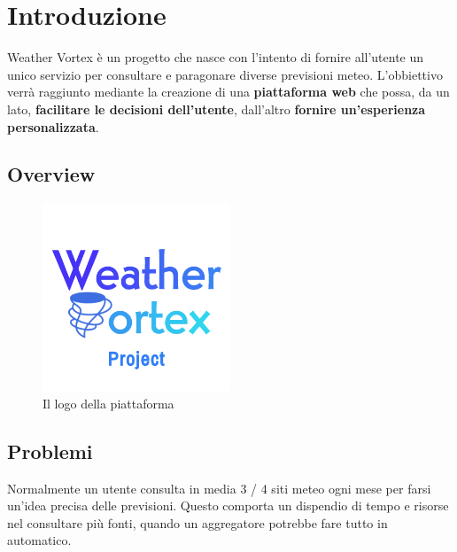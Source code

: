 

\chapter{Introduzione}
Weather Vortex è un progetto che nasce con l'intento di fornire all'utente un unico servizio per consultare e paragonare diverse previsioni meteo. L'obbiettivo verrà raggiunto mediante la creazione di una \textbf{piattaforma web} che possa, da un lato, \textbf{facilitare le decisioni dell'utente}, dall'altro \textbf{fornire un'esperienza personalizzata}.

\section{Overview}

\begin{figure}[H]
    \caption{Il logo della piattaforma}
    \label{fig:Logo}
    \centering
    \includegraphics[width=0.5\textwidth]{Images/logo.png}
\end{figure}

\section{Problemi}
Normalmente un utente consulta in media 3 / 4 siti meteo ogni mese per farsi un'idea precisa delle previsioni. Questo comporta un dispendio di tempo e risorse nel consultare più fonti, quando un aggregatore potrebbe fare tutto in automatico.

